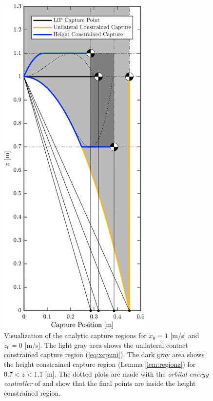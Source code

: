 \begin{figure}
      \centering
      \includegraphics[width=3in]{STYLESTUFF/CPLimitsDark.png}
      \caption{Visualization of the analytic capture regions for $\dot{x}_0=1$ [m/s] and $\dot{z}_0=0$ [m/s]. The light gray area shows the unilateral contact constrained capture region (\ref{eq:xcpuni}). The dark gray area shows the height constrained capture region (Lemma \ref{lem:regionz})  for $0.7<z<1.1$ [m]. The dotted plots are made with the \textit{orbital energy controller} of \cite{koolen2016balance} and show that the final points are inside the height constrained region.}
      \label{fig:capregion}
\end{figure}

